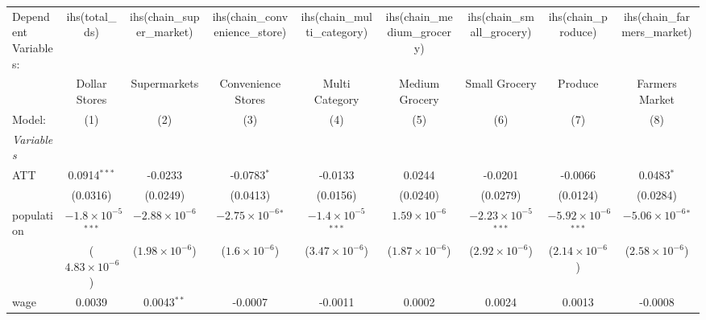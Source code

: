 \begingroup
\centering
\begin{tabular}{lcccccccc}
   \tabularnewline \midrule \midrule
   Dependent Variables: & ihs(total\_ds)                & ihs(chain\_super\_market)   & ihs(chain\_convenience\_store)   & ihs(chain\_multi\_category)   & ihs(chain\_medium\_grocery)   & ihs(chain\_small\_grocery)     & ihs(chain\_produce)            & ihs(chain\_farmers\_market)\\    
                        & Dollar Stores                 & Supermarkets                & Convenience Stores               & Multi Category                & Medium Grocery                & Small Grocery                  & Produce                        & Farmers Market \\   
   Model:               & (1)                           & (2)                         & (3)                              & (4)                           & (5)                           & (6)                            & (7)                            & (8)\\  
   \midrule
   \emph{Variables}\\
   ATT                  & 0.0914$^{***}$                & -0.0233                     & -0.0783$^{*}$                    & -0.0133                       & 0.0244                        & -0.0201                        & -0.0066                        & 0.0483$^{*}$\\   
                        & (0.0316)                      & (0.0249)                    & (0.0413)                         & (0.0156)                      & (0.0240)                      & (0.0279)                       & (0.0124)                       & (0.0284)\\   
   population           & $-1.8\times 10^{-5}$$^{***}$  & $-2.88\times 10^{-6}$       & $-2.75\times 10^{-6}$$^{*}$      & $-1.4\times 10^{-5}$$^{***}$  & $1.59\times 10^{-6}$          & $-2.23\times 10^{-5}$$^{***}$  & $-5.92\times 10^{-6}$$^{***}$  & $-5.06\times 10^{-6}$$^{*}$\\    
                        & ($4.83\times 10^{-6}$)        & ($1.98\times 10^{-6}$)      & ($1.6\times 10^{-6}$)            & ($3.47\times 10^{-6}$)        & ($1.87\times 10^{-6}$)        & ($2.92\times 10^{-6}$)         & ($2.14\times 10^{-6}$)         & ($2.58\times 10^{-6}$)\\    
   wage                 & 0.0039                        & 0.0043$^{**}$               & -0.0007                          & -0.0011                       & 0.0002                        & 0.0024                         & 0.0013                         & -0.0008\\   

\end{tabular}
